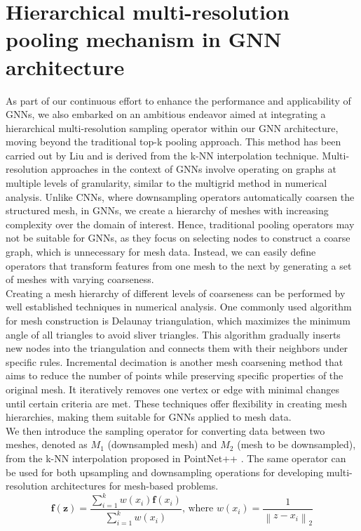 \section{Hierarchical multi-resolution pooling mechanism in GNN architecture}
As part of our continuous effort to enhance the performance and applicability of GNNs, we also embarked on an ambitious endeavor aimed at integrating a hierarchical multi-resolution sampling operator within our GNN architecture, moving beyond the traditional top-k pooling approach. This method has been carried out by Liu \cite{metalearning} and is derived from the k-NN interpolation technique. 
Multi-resolution approaches in the context of GNNs involve operating on graphs at multiple levels of granularity, similar to the multigrid method in numerical analysis. Unlike CNNs, where downsampling operators automatically coarsen the structured mesh, in GNNs, we create a hierarchy of meshes with increasing complexity over the domain of interest. Hence, traditional pooling operators may not be suitable for GNNs, as they focus on selecting nodes to construct a coarse graph, which is unnecessary for mesh data. Instead, we can easily define operators that transform features from one mesh to the next by generating a set of meshes with varying coarseness.\\
Creating a mesh hierarchy of different levels of coarseness can be performed by well established techniques in numerical analysis. One commonly used algorithm for mesh construction is Delaunay triangulation, which maximizes the minimum angle of all triangles to avoid sliver triangles. This algorithm gradually inserts new nodes into the triangulation and connects them with their neighbors under specific rules. Incremental decimation is another mesh coarsening method that aims to reduce the number of points while preserving specific properties of the original mesh. It iteratively removes one vertex or edge with minimal changes until certain criteria are met. These techniques offer flexibility in creating mesh hierarchies, making them suitable for GNNs applied to mesh data.\\
We then introduce the sampling operator for converting data between two meshes, denoted as $M_1$ (downsampled mesh) and $M_2$ (mesh to be downsampled), from the k-NN interpolation proposed in PointNet++ \cite{pnpp}. The same operator can be used for both upsampling and downsampling operations for developing multi-resolution architectures for mesh-based problems. \\
\begin{equation}
    \mathbf{f}(\mathbf{z})=\frac{\sum_{i=1}^k w\left(x_i\right) \mathbf{f}\left(x_i\right)}{\sum_{i=1}^k w\left(x_i\right)} \text {, where } w\left(x_i\right)=\frac{1}{\left\|z-x_i\right\|_2}
    \end{equation}

